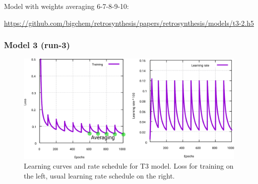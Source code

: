 \documentclass{article}
\begin{document}
Model with weights averaging 6-7-8-9-10:

\url{https://github.com/bigchem/retrosynthesis/papers/retrosynthesis/models/t3-2.h5}
\newpage


\subsubsection{Model 3 (run-3)}
 
\begin{figure}[h!]
  \centering
  \includegraphics[width = 16.5cm]{images/t3-3.pdf}
  \caption{Learning curves and rate schedule for T3 model. Loss for training on the left, usual learning rate schedule on the right.}
  \label{fig:t11}
\end{figure}
\end{document}
